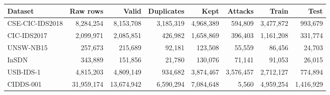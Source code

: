 \begin{tabular}{@{}lrrrrrrr@{}}
\toprule
\textbf{Dataset} & \textbf{Raw rows} & \textbf{Valid} & \textbf{Duplicates} & \textbf{Kept} & \textbf{Attacks} & \textbf{Train} & \textbf{Test} \\
\midrule
CSE-CIC-IDS2018 & 8,284,254 & 8,153,708 & 3,185,319 & 4,968,389 & 594,809 & 3,477,872 & 993,679 \\
CIC-IDS2017 & 2,099,971 & 2,085,851 & 426,982 & 1,658,869 & 396,403 & 1,161,208 & 331,774 \\
UNSW-NB15 & 257,673 & 215,689 & 92,181 & 123,508 & 55,559 & 86,456 & 24,703 \\
InSDN & 343,889 & 151,856 & 21,780 & 130,076 & 71,141 & 91,053 & 26,015 \\
USB-IDS-1 & 4,815,203 & 4,809,149 & 934,682 & 3,874,467 & 3,576,457 & 2,712,127 & 774,894 \\
CIDDS-001 & 31,959,174 & 13,674,942 & 6,590,294 & 7,084,648 & 5,560 & 4,959,254 & 1,416,929 \\
\bottomrule
\end{tabular}
